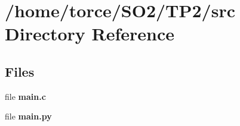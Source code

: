 \section{/home/torce/\+S\+O2/\+T\+P2/src Directory Reference}
\label{dir_68267d1309a1af8e8297ef4c3efbcdba}
\subsection*{Files}
\begin{DoxyCompactItemize}
\item 
file \textbf{ main.\+c}
\item 
file \textbf{ main.\+py}
\end{DoxyCompactItemize}
